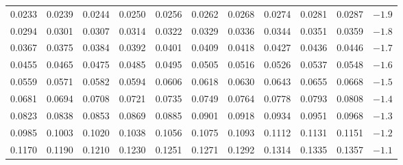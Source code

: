 \begin{table}[p]
\begin{center}
{\begin{tabular}{| rrrrr | rrrrr | c}
    \hline
    \hline
  \footnotesize{0.0233} & \footnotesize{0.0239} & \footnotesize{0.0244} & \footnotesize{0.0250} & \footnotesize{0.0256} & \footnotesize{0.0262} & \footnotesize{0.0268} & \footnotesize{0.0274} & \footnotesize{0.0281} & \footnotesize{0.0287} & $-1.9$ \\
  \footnotesize{0.0294} & \footnotesize{0.0301} & \footnotesize{0.0307} & \footnotesize{0.0314} & \footnotesize{0.0322} & \footnotesize{0.0329} & \footnotesize{0.0336} & \footnotesize{0.0344} & \footnotesize{0.0351} & \footnotesize{0.0359} & $-1.8$ \\
  \footnotesize{0.0367} & \footnotesize{0.0375} & \footnotesize{0.0384} & \footnotesize{0.0392} & \footnotesize{0.0401} & \footnotesize{0.0409} & \footnotesize{0.0418} & \footnotesize{0.0427} & \footnotesize{0.0436} & \footnotesize{0.0446} & $-1.7$ \\
  \footnotesize{0.0455} & \footnotesize{0.0465} & \footnotesize{0.0475} & \footnotesize{0.0485} & \footnotesize{0.0495} & \footnotesize{0.0505} & \footnotesize{0.0516} & \footnotesize{0.0526} & \footnotesize{0.0537} & \footnotesize{0.0548} & $-1.6$ \\
  \footnotesize{0.0559} & \footnotesize{0.0571} & \footnotesize{0.0582} & \footnotesize{0.0594} & \footnotesize{0.0606} & \footnotesize{0.0618} & \footnotesize{0.0630} & \footnotesize{0.0643} & \footnotesize{0.0655} & \footnotesize{0.0668} & $-1.5$ \\
    \hline
  \footnotesize{0.0681} & \footnotesize{0.0694} & \footnotesize{0.0708} & \footnotesize{0.0721} & \footnotesize{0.0735} & \footnotesize{0.0749} & \footnotesize{0.0764} & \footnotesize{0.0778} & \footnotesize{0.0793} & \footnotesize{0.0808} & $-1.4$ \\
  \footnotesize{0.0823} & \footnotesize{0.0838} & \footnotesize{0.0853} & \footnotesize{0.0869} & \footnotesize{0.0885} & \footnotesize{0.0901} & \footnotesize{0.0918} & \footnotesize{0.0934} & \footnotesize{0.0951} & \footnotesize{0.0968} & $-1.3$ \\
  \footnotesize{0.0985} & \footnotesize{0.1003} & \footnotesize{0.1020} & \footnotesize{0.1038} & \footnotesize{0.1056} & \footnotesize{0.1075} & \footnotesize{0.1093} & \footnotesize{0.1112} & \footnotesize{0.1131} & \footnotesize{0.1151} & $-1.2$ \\
  \footnotesize{0.1170} & \footnotesize{0.1190} & \footnotesize{0.1210} & \footnotesize{0.1230} & \footnotesize{0.1251} & \footnotesize{0.1271} & \footnotesize{0.1292} & \footnotesize{0.1314} & \footnotesize{0.1335} & \footnotesize{0.1357} & $-1.1$ \\

\end{tabular}}
\end{center}
\end{table}
